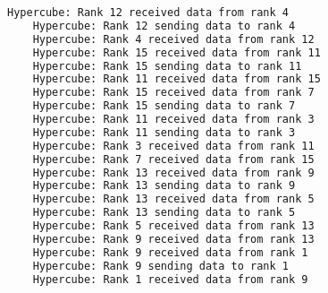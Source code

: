 \documentclass[11pt]{article}
\begin{document}
\begin{lstlisting}[language=bash,caption=Baobab Output]
    Hypercube: Rank 12 received data from rank 4
    Hypercube: Rank 12 sending data to rank 4
    Hypercube: Rank 4 received data from rank 12
    Hypercube: Rank 15 received data from rank 11
    Hypercube: Rank 15 sending data to rank 11
    Hypercube: Rank 11 received data from rank 15
    Hypercube: Rank 15 received data from rank 7
    Hypercube: Rank 15 sending data to rank 7
    Hypercube: Rank 11 received data from rank 3
    Hypercube: Rank 11 sending data to rank 3
    Hypercube: Rank 3 received data from rank 11
    Hypercube: Rank 7 received data from rank 15
    Hypercube: Rank 13 received data from rank 9
    Hypercube: Rank 13 sending data to rank 9
    Hypercube: Rank 13 received data from rank 5
    Hypercube: Rank 13 sending data to rank 5
    Hypercube: Rank 5 received data from rank 13
    Hypercube: Rank 9 received data from rank 13
    Hypercube: Rank 9 received data from rank 1
    Hypercube: Rank 9 sending data to rank 1
    Hypercube: Rank 1 received data from rank 9    
\end{lstlisting}
\end{document}
